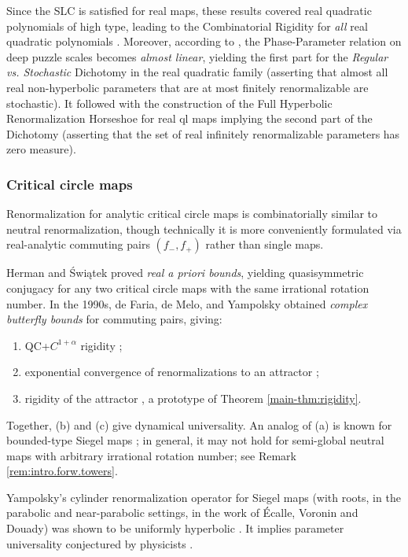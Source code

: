 \documentclass{amsart}
\begin{document}
Since the SLC is satisfied for real maps,
these results covered real quadratic polynomials of high type,
leading to the Combinatorial Rigidity for \emph{all} real quadratic polynomials \cite{Lyu97}. 
Moreover, according to \cite{Lyu00}, the Phase-Parameter relation on deep puzzle scales 
becomes {\em almost linear}, 
yielding the first part for the \emph{Regular vs. Stochastic} Dichotomy in the real quadratic family
(asserting that almost all real non-hyperbolic parameters that are at most finitely renormalizable are stochastic).
It followed with the construction of the Full Hyperbolic Renormalization Horseshoe for real ql maps \cite{L02}
implying the second part of the Dichotomy (asserting that the set of  
real infinitely renormalizable parameters has zero measure).

\subsubsection{Critical circle maps}
\label{sss:circle-maps}

Renormalization for analytic critical circle maps is combinatorially similar to neutral renormalization, though technically it is more conveniently formulated via real-analytic commuting pairs $(f_-,f_+)$ rather than single maps.

Herman and \'{S}wi\k{a}tek \cite{H87,Sw87}  proved \emph{real a priori bounds}, yielding quasisymmetric conjugacy for any two critical circle maps with the same irrational rotation number.
In the 1990s, de Faria, de Melo, and Yampolsky \cite{dF99,dFdM00,Y99} obtained \emph{complex butterfly bounds} for commuting pairs, giving:
\begin{enumerate}
    \item[(a)] QC+$C^{1+\alpha}$ rigidity \cite{dFdM00,Y99,KY06};
    \item[(b)] exponential convergence of renormalizations to an attractor \cite{dFdM99};
    \item[(c)] rigidity of the attractor \cite{Y01},  a prototype of Theorem \ref{main-thm:rigidity}.
\end{enumerate}
Together, (b) and (c) give dynamical universality.
An analog of (a) is known for bounded-type Siegel maps \cite{AL22}; in general, it may not hold for semi-global neutral maps with arbitrary irrational rotation number; see Remark \ref{rem:intro.forw.towers}.

Yampolsky's cylinder renormalization operator for Siegel maps
(with roots, in the parabolic and near-parabolic  settings, in the work of \'{E}calle, Voronin and Douady)  
was shown to be uniformly hyperbolic \cite{Y03a,Y03b}. 
It implies parameter universality conjectured by physicists \cite{FKS,ORSS}.
\end{document}
